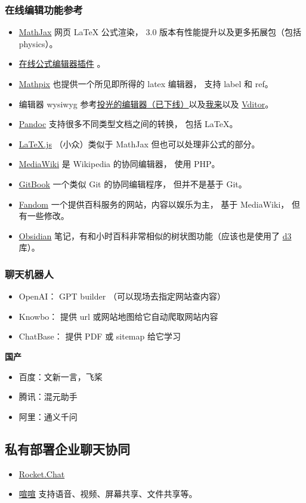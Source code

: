 \subsubsection{在线编辑功能参考}
\begin{itemize}
\item \href{https://www.mathjax.org}{MathJax} 网页 LaTeX 公式渲染， 3.0 版本有性能提升以及更多拓展包（包括 physics）。
\item \href{https://demo.wiris.com/mathtype/en/developers.php}{在线公式编辑器插件} 。
\item \href{https://mathpix.com/ocr?gclid=CjwKCAiAy_CcBhBeEiwAcoMRHKnSPGjROmFGBj5R_Ev3hke7lG7xNIzKDHv5FgkMFq62aXRpISt_LhoC47YQAvD_BwE}{Mathpix} 也提供一个所见即所得的 latex 编辑器， 支持 label 和 ref。
\item 编辑器 wysiwyg 参考\href{https://editoe.com}{投光的编辑器（已下线）}以及\href{https://www.wolai.com}{我来}以及 \href{https://github.com/Vanessa219/vditor}{Vditor}。
\item \href{https://pandoc.org/}{Pandoc} 支持很多不同类型文档之间的转换， 包括 LaTeX。
\item \href{https://github.com/michael-brade/LaTeX.js}{LaTeX.js} （小众）类似于 MathJax 但也可以处理非公式的部分。
\item \href{https://www.mediawiki.org/wiki/MediaWiki}{MediaWiki} 是 Wikipedia 的协同编辑器， 使用 PHP。
\item \href{https://www.gitbook.com/}{GitBook} 一个类似 Git 的协同编辑程序， 但并不是基于 Git。
\item \href{https://www.fandom.com/}{Fandom} 一个提供百科服务的网站，内容以娱乐为主， 基于 MediaWiki， 但有一些修改。
\item \href{https://obsidian.md/}{Obsidian} 笔记，有和小时百科非常相似的树状图功能（应该也是使用了 \href{https://d3js.org/}{d3} 库）。
\end{itemize}

\subsubsection{聊天机器人}
\begin{itemize}
\item OpenAI： GPT builder （可以现场去指定网站查内容）
\item Knowbo： 提供 url 或网站地图给它自动爬取网站内容
\item ChatBase： 提供 PDF 或 sitemap 给它学习
\end{itemize}

\textbf{国产}
\begin{itemize}
\item 百度：文新一言，飞桨
\item 腾讯：混元助手
\item 阿里：通义千问
\end{itemize}

\subsection{私有部署企业聊天协同}
\begin{itemize}
\item \href{https://www.rocket.chat/}{Rocket.Chat}
\item \href{https://xuanim.com/}{喧喧} 支持语音、视频、屏幕共享、文件共享等。
\end{itemize}

